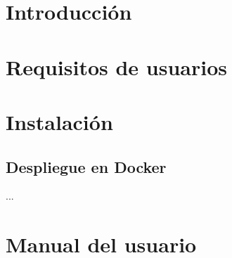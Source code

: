 
\section{Introducción}

\section{Requisitos de usuarios}

\section{Instalación}

\subsection{Despliegue en Docker}
\label{s-e:docker-deploy-users}

...

\section{Manual del usuario}
